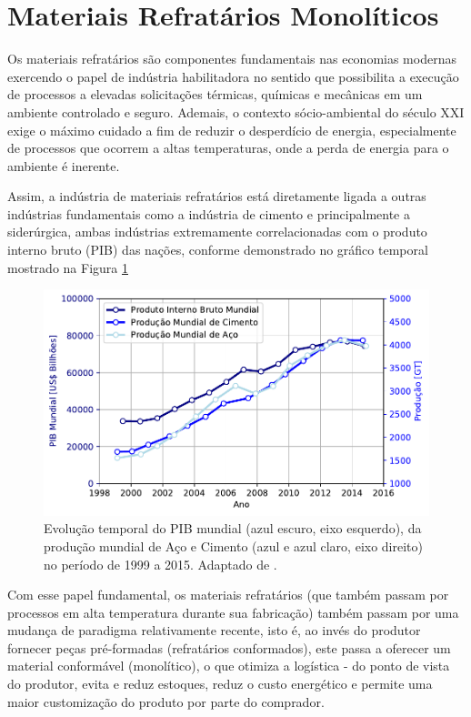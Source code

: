 \section{Materiais Refratários Monolíticos}\label{mono}

	Os materiais refratários são componentes fundamentais nas economias modernas exercendo o papel de indústria habilitadora no sentido que possibilita a execução de processos a elevadas solicitações térmicas, químicas e mecânicas em um ambiente controlado e seguro. Ademais, o contexto sócio-ambiental do século XXI exige o máximo cuidado a fim de reduzir o desperdício de energia, especialmente de processos que ocorrem a altas temperaturas, onde a perda de energia para o ambiente é inerente.

	Assim, a indústria de materiais refratários está diretamente ligada a outras indústrias fundamentais como a indústria de cimento e principalmente a siderúrgica, ambas indústrias extremamente correlacionadas com o produto interno bruto (PIB) das nações, conforme demonstrado no gráfico temporal mostrado na Figura \ref{fig:refractory_economy}

\begin{figure}[ht]
\centering
\includegraphics[width=\linewidth]{./figures/refractory_economy.pdf}
\caption{Evolução temporal do PIB mundial (azul escuro, eixo esquerdo), da produção mundial de Aço e Cimento (azul e azul claro, eixo direito) no período de 1999 a 2015.  Adaptado de \cite{GlobalRef2017}. \label{fig:refractory_economy}}
\end{figure}
		Com esse papel fundamental, os materiais refratários (que também passam por processos em alta temperatura durante sua fabricação) também passam por uma mudança de paradigma relativamente recente, isto é, ao invés do produtor fornecer peças pré-formadas (refratários conformados), este passa a oferecer um material conformável (monolítico), o que otimiza a logística - do ponto de vista do produtor, evita e reduz estoques, reduz o custo energético e permite uma maior customização do produto por parte do comprador.
        

